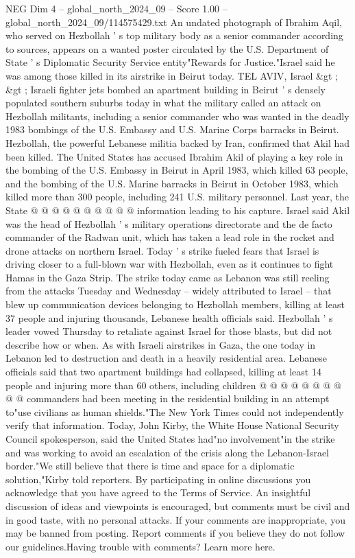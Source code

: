 \begin{textsample}{NEG Dim 4 – global\_north\_2024\_09 – Score 1.00 – global\_north\_2024\_09/114575429.txt}  \label{ex:f4_neg_134}
An undated photograph of Ibrahim Aqil, who served on Hezbollah ' s top military body as a senior commander according to sources, appears on a wanted poster circulated by the U.S.
Department of State ' s Diplomatic Security Service entity"Rewards for Justice."Israel said he was among those killed in its airstrike in Beirut today.
TEL AVIV, Israel \&gt ; \&gt ; Israeli fighter jets bombed an apartment building in Beirut ' s densely populated southern suburbs today in what the military called an attack on Hezbollah militants, including a senior commander who was wanted in the deadly 1983 bombings of the U.S.
Embassy and U.S.
Marine Corps barracks in Beirut.
Hezbollah, the powerful Lebanese militia backed by Iran, confirmed that Akil had been killed.
The United States has accused Ibrahim Akil of playing a key role in the bombing of the U.S.
Embassy in Beirut in April 1983, which killed 63 people, and the bombing of the U.S.
Marine barracks in Beirut in October 1983, which killed more than 300 people, including 241 U.S. military personnel.
Last year, the State @ @ @ @ @ @ @ @ @ @ information leading to his capture.
Israel said Akil was the head of Hezbollah ' s military operations directorate and the de facto commander of the Radwan unit, which has taken a lead role in the rocket and drone attacks on northern Israel.
Today ' s strike fueled fears that Israel is driving closer to a full-blown war with Hezbollah, even as it continues to fight Hamas in the Gaza Strip.
The strike today came as Lebanon was still reeling from the attacks Tuesday and Wednesday -- widely attributed to Israel -- that blew up communication devices belonging to Hezbollah members, killing at least 37 people and injuring thousands, Lebanese health officials said.
Hezbollah ' s leader vowed Thursday to retaliate against Israel for those blasts, but did not describe how or when.
As with Israeli airstrikes in Gaza, the one today in Lebanon led to destruction and death in a heavily residential area.
Lebanese officials said that two apartment buildings had collapsed, killing at least 14 people and injuring more than 60 others, including children @ @ @ @ @ @ @ @ @ @ commanders had been meeting in the residential building in an attempt to"use civilians as human shields."The New York Times could not independently verify that information.
Today, John Kirby, the White House National Security Council spokesperson, said the United States had"no involvement"in the strike and was working to avoid an escalation of the crisis along the Lebanon-Israel border."We still believe that there is time and space for a diplomatic solution,"Kirby told reporters.
By participating in online discussions you acknowledge that you have agreed to the Terms of Service.
An insightful discussion of ideas and viewpoints is encouraged, but comments must be civil and in good taste, with no personal attacks.
If your comments are inappropriate, you may be banned from posting.
Report comments if you believe they do not follow our guidelines.Having trouble with comments?
Learn more here.

\end{textsample}
